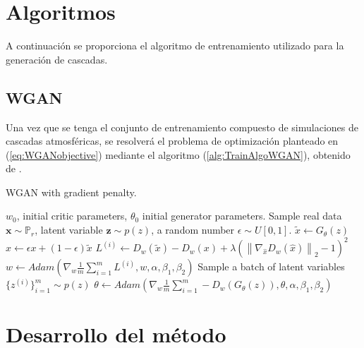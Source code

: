\section{Algoritmos}

A continuación se proporciona el algoritmo de entrenamiento utilizado para la generación de cascadas.

\subsection{WGAN}

Una vez que se tenga el conjunto de entrenamiento compuesto de simulaciones de cascadas atmosféricas, se resolverá el problema de optimización planteado en (\ref{eq:WGANobjective}) mediante el algoritmo (\ref{alg:TrainAlgoWGAN}), obtenido de \parencite{Gulrajani2017}.

\begin{algorithm}
    \caption{WGAN with gradient penalty.}
    \label{alg:TrainAlgoWGAN}
    \begin{algorithmic}
        \Require $w_0$, initial critic parameters, $\theta_0$ initial generator parameters.
                    \State Sample real data $\textbf{x} \sim \mathbb{P}_r$, latent variable $\textbf{z} \sim p(z)$, a random number $\epsilon \sim U[0,1]$.
                    \State $\tilde{x} \gets G_\theta (z)$
                    \State $\hat{x} \gets \epsilon x + (1 - \epsilon)\tilde{x}$
                    \State $L^{(i)} \gets D_w(\tilde{x}) - D_w(x) + \lambda (\left\lVert \nabla_{\hat{x}}D_w(\hat{x})\right\rVert_{2} - 1 )^{2}$
                \EndFor
                \State $w \gets Adam(\nabla_w\frac{1}{m}\sum_{i=1}^mL^{(i)},w,\alpha,\beta_1,\beta_2)$
            \EndFor
            \State Sample a batch of latent variables $\{ z^{(i)}\} _{i=1}^m \sim p(z)$
            \State $\theta \gets Adam(\nabla_w\frac{1}{m}\sum_{i=1}^m-D_w(G_\theta(z)),\theta,\alpha,\beta_1,\beta_2)$
        \EndWhile
    \end{algorithmic}
\end{algorithm}

\section{Desarrollo del método}

